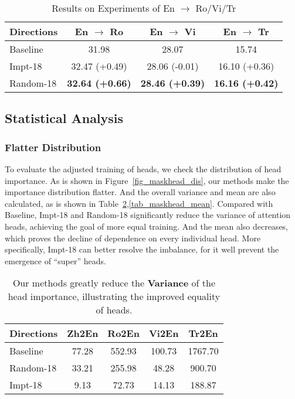 \documentclass[11pt]{article}
\begin{document}
\begin{table}[h]\footnotesize
    \centering
    \begin{tabular}{lccc}
        \hline
        Directions & En $\rightarrow$ Ro & En $\rightarrow$ Vi & En $\rightarrow$ Tr \\ \hline
        Baseline & 31.98 & 28.07 & 15.74 \\
Impt-18 & 32.47 (+0.49) & 28.06 (-0.01) & 16.10 (+0.36) \\
        Random-18 & \textbf{32.64 (+0.66)} & \textbf{28.46 (+0.39)} & \textbf{16.16 (+0.42)} \\ \hline
\end{tabular}
    \caption{Results on Experiments of En $\rightarrow$ Ro/Vi/Tr}
    \label{tab_trans_en2x}
\end{table}



\subsection{Statistical Analysis} 

\subsubsection{Flatter Distribution} 

To evaluate the adjusted training of heads, we check the distribution of head importance. As is shown in Figure~\ref{fig_maskhead_dis}, our methods make the importance distribution flatter. And the overall variance and mean are also calculated, as is shown in Table~\ref{tab_maskhead_var},\ref{tab_maskhead_mean}. Compared with Baseline, Impt-18 and Random-18 significantly reduce the variance of attention heads, achieving the goal of more equal training. And the mean also decreases, which proves the decline of dependence on every individual head. More specifically, Impt-18 can better resolve the imbalance, for it well prevent the emergence of ``super'' heads.





\begin{table}[h]\footnotesize
    \centering
    \begin{tabular}{lcccc}
        \hline
        Directions & Zh2En & Ro2En & Vi2En & Tr2En\\ \hline
        Baseline & 77.28 & 552.93 & 100.73 & 1767.70 \\
        Random-18 & 33.21 & 255.98 & 48.28 & 900.70  \\
        Impt-18 & 9.13 & 72.73 & 14.13 & 188.87  \\ \hline
    \end{tabular}
    \caption{Our methods greatly reduce the \textbf{Variance} of the head importance, illustrating the improved equality of heads.}
    \label{tab_maskhead_var}
\end{table}
\end{document}
